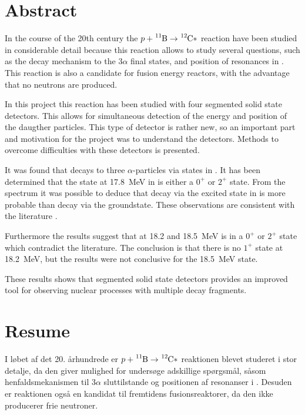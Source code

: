 \begingroup
\let\clearpage\relax
\vspace*{-5.5\onelineskip}
\chapter{Abstract}
\label{cha:abstract}
\vspace{-0.5\onelineskip}

In the course of the 20th century the $p + \Bor \rightarrow \Carb*$ reaction have been studied in
considerable detail because this reaction allows to study several questions, such as the decay
mechanism to the $3\alpha$ final states, and position of resonances in \Carb. This reaction is also a
candidate for fusion energy reactors, with the advantage that no neutrons are produced.

In this project this reaction has been studied with four segmented solid state detectors. This allows
for simultaneous detection of the energy and position of the daugther particles. This type of
detector is rather new, so an important part and motivation for the project was to understand the
detectors. Methods to overcome difficulties with these detectors is presented.

It was found that \Carb decays to three $\alpha$-particles via states in \Be. It has been determined that
the state at \SI{17.8}{\MeV} in \Carb is either a $0^{+}$ or $2^{+}$ state. From the spectrum it was
possible to deduce that decay via the excited state in \Be is more probable than decay via the
groundstate. These observations are consistent with the literature \cite{States}.

Furthermore the results suggest that at \num{18.2} and \SI{18.5}{\MeV} \Carb is in a $0^{+}$ or
$2^{+}$ state which contradict the literature. The conclusion is that there is no $1^{+}$ state at
\SI{18.2}{\MeV}, but the results were not conclusive for the \SI{18.5}{\MeV} state.

These results shows that segmented solid state detectors provides an improved tool for observing
nuclear processes with multiple decay fragments. 

\vspace{1\onelineskip}
\chapter{Resume}
\label{cha:resume}
\vspace{-0.5\onelineskip}

I løbet af det 20. århundrede er $p + \Bor \rightarrow \Carb*$ reaktionen blevet studeret i stor
detalje, da den giver mulighed for undersøge adskillige spørgsmål, såsom henfaldsmekanismen til $3\alpha$
sluttilstande og positionen af resonanser i \Carb. Desuden er reaktionen også en kandidat til
fremtidens fusionsreaktorer, da den ikke producerer frie neutroner. 

